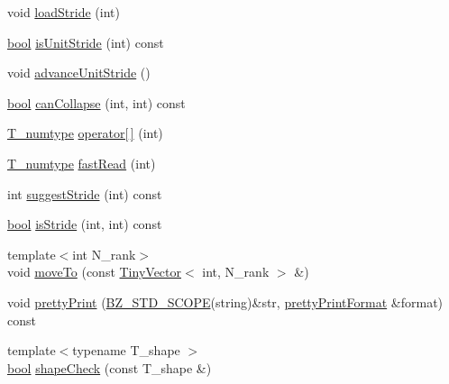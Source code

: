 \begin{DoxyCompactItemize}
\item 
void \hyperlink{class__bz__ArrayExprConstant_a448f23dbf7f7bffe2c7cd8d13326b3f7}{load\+Stride} (int)
\item 
\hyperlink{compiler_8h_abb452686968e48b67397da5f97445f5b}{bool} \hyperlink{class__bz__ArrayExprConstant_ab678219a1fc875b81e8dffdf9ea45734}{is\+Unit\+Stride} (int) const 
\item 
void \hyperlink{class__bz__ArrayExprConstant_a4a77d0903e4f0af8b02aa644046d5381}{advance\+Unit\+Stride} ()
\item 
\hyperlink{compiler_8h_abb452686968e48b67397da5f97445f5b}{bool} \hyperlink{class__bz__ArrayExprConstant_abb55d6a673ab35ed3643ed9b24b8ee64}{can\+Collapse} (int, int) const 
\item 
\hyperlink{class__bz__ArrayExprConstant_a7a9b5e4fa964d73b7f8b31e7977123cb}{T\+\_\+numtype} \hyperlink{class__bz__ArrayExprConstant_a9389184258cddfb18e2f321cd509bbf1}{operator\mbox{[}$\,$\mbox{]}} (int)
\item 
\hyperlink{class__bz__ArrayExprConstant_a7a9b5e4fa964d73b7f8b31e7977123cb}{T\+\_\+numtype} \hyperlink{class__bz__ArrayExprConstant_a6b9feaed004b8d524c9a448c70edc3d1}{fast\+Read} (int)
\item 
int \hyperlink{class__bz__ArrayExprConstant_a5f229c772ee073250430dc0d55f931d4}{suggest\+Stride} (int) const 
\item 
\hyperlink{compiler_8h_abb452686968e48b67397da5f97445f5b}{bool} \hyperlink{class__bz__ArrayExprConstant_a962053035b6d9ce60e9499ca0d106ae1}{is\+Stride} (int, int) const 
\item 
{\footnotesize template$<$int N\+\_\+rank$>$ }\\void \hyperlink{class__bz__ArrayExprConstant_a4dc9172d9d38cd45d497e3ba174e69c2}{move\+To} (const \hyperlink{classTinyVector}{Tiny\+Vector}$<$ int, N\+\_\+rank $>$ \&)
\item 
void \hyperlink{class__bz__ArrayExprConstant_af9424e8a1aba3f8ee17f45969336713b}{pretty\+Print} (\hyperlink{numinquire_8h_a2b24ffc3b4ef9803956bc7715c6c7b83}{B\+Z\+\_\+\+S\+T\+D\+\_\+\+S\+C\+O\+P\+E}(string)\&str, \hyperlink{classprettyPrintFormat}{pretty\+Print\+Format} \&format) const 
\item 
{\footnotesize template$<$typename T\+\_\+shape $>$ }\\\hyperlink{compiler_8h_abb452686968e48b67397da5f97445f5b}{bool} \hyperlink{class__bz__ArrayExprConstant_afd12026044ab21e4ccbb590c26069e41}{shape\+Check} (const T\+\_\+shape \&)
\end{DoxyCompactItemize}
